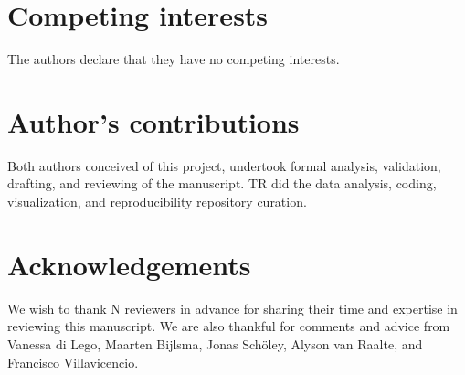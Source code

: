 \documentclass{bmcart}
\begin{document}
\begin{backmatter}

  
\section*{Competing interests}
  The authors declare that they have no competing interests.

\section*{Author's contributions}
  Both authors conceived of this project, undertook formal analysis, validation, drafting, and reviewing of the manuscript. TR did the data analysis, coding, visualization, and reproducibility repository curation.

\section*{Acknowledgements}
  We wish to thank N reviewers in advance for sharing their time and expertise in reviewing this manuscript. We are also thankful for comments and advice from Vanessa di Lego, Maarten Bijlsma, Jonas Sch\"oley, Alyson van Raalte, and Francisco Villavicencio.



\end{backmatter}
\end{document}
